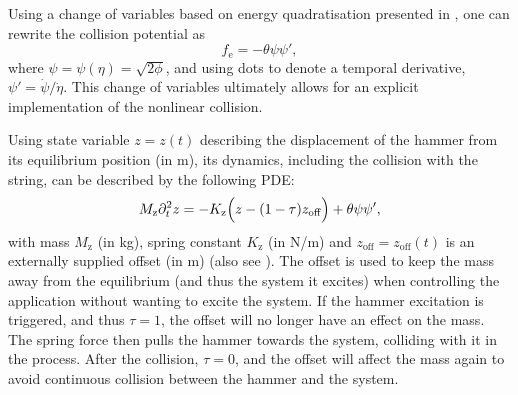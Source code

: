 \documentclass{article}
\begin{document}
Using a change of variables based on energy quadratisation presented in \cite{Ducceschi2021}, one can rewrite the collision potential as
\begin{equation}
    f_\text{e} = -\theta\psi \psi',
\end{equation}
where $\psi = \psi(\eta) = \sqrt{2\phi}$, and using dots to denote a temporal derivative, $\psi' = \dot \psi / \dot \eta$. This change of variables ultimately allows for an explicit implementation of the nonlinear collision. 

Using state variable $z = z(t)$ describing the displacement of the hammer from its equilibrium position (in m), its dynamics, including the collision with the string, can be described by the following PDE:
\begin{equation}\label{eq:massSpring}
    M_\text{z}\partial_t^2 z = -K_\text{z} \Big(z - (1-\tau)z_\text{off}\Big) + \theta \psi\psi',
\end{equation}
with mass $M_\text{z}$ (in kg), spring constant $K_\text{z}$ (in N/m) and $z_\text{off} = z_\text{off}(t)$ is an externally supplied offset (in m) (also see \cite{Willemsen2020}). The offset is used to keep the mass away from the equilibrium (and thus the system it excites) when controlling the application without wanting to excite the system. If the hammer excitation is triggered, and thus $\tau = 1$, the offset will no longer have an effect on the mass. The spring force then pulls the hammer towards the system, colliding with it in the process. After the collision, $\tau = 0$, and the offset will affect the mass again to avoid continuous collision between the hammer and the system. 
\end{document}
